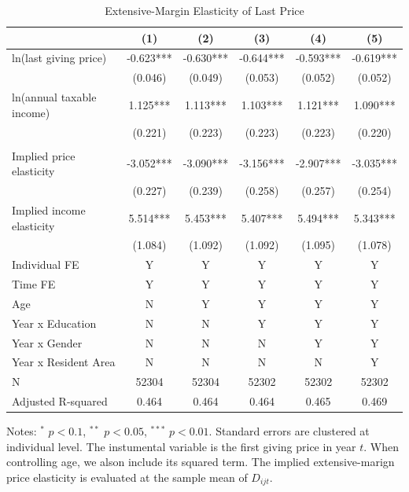\documentclass[
  11pt,
  a4paper,
]{article}
\begin{document}
\begin{table}

\caption{\label{tab:LastExtensive}Extensive-Margin Elasticity of Last Price}
\centering
\fontsize{9}{11}\selectfont
\begin{threeparttable}
\begin{tabular}[t]{lccccc}
\toprule
 & (1) & (2) & (3) & (4) & (5)\\
\midrule
ln(last giving price) & -0.623*** & -0.630*** & -0.644*** & -0.593*** & -0.619***\\
 & (0.046) & (0.049) & (0.053) & (0.052) & (0.052)\\
ln(annual taxable income) & 1.125*** & 1.113*** & 1.103*** & 1.121*** & 1.090***\\
 & (0.221) & (0.223) & (0.223) & (0.223) & (0.220)\\
 &  &  &  &  & \\
Implied price elasticity & -3.052*** & -3.090*** & -3.156*** & -2.907*** & -3.035***\\
 & (0.227) & (0.239) & (0.258) & (0.257) & (0.254)\\
Implied income elasticity & 5.514*** & 5.453*** & 5.407*** & 5.494*** & 5.343***\\
 & (1.084) & (1.092) & (1.092) & (1.095) & (1.078)\\
Individual FE & Y & Y & Y & Y & Y\\
Time FE & Y & Y & Y & Y & Y\\
Age & N & Y & Y & Y & Y\\
Year x Education & N & N & Y & Y & Y\\
Year x Gender & N & N & N & Y & Y\\
Year x Resident Area & N & N & N & N & Y\\
N & 52304 & 52304 & 52302 & 52302 & 52302\\
Adjusted R-squared & 0.464 & 0.464 & 0.464 & 0.465 & 0.469\\
\bottomrule
\end{tabular}
\begin{tablenotes}
\item Notes: $^{*}$ $p < 0.1$, $^{**}$ $p < 0.05$, $^{***}$ $p < 0.01$. Standard errors are clustered at individual level. The instumental variable is the first giving price in year $t$. When controlling age, we alson include its squared term. The implied extensive-marign price elasticity is evaluated at the sample mean of $D_{ijt}$.
\end{tablenotes}
\end{threeparttable}
\end{table}
\end{document}
